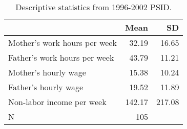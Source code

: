 \begin{table}[ht]
\centering
\begin{tabular}{lrr}
  \hline
 & Mean & SD \\ 
  \hline
Mother's work hours per week & 32.19 & 16.65 \\ 
  Father's work hours per week & 43.79 & 11.21 \\ 
  Mother's hourly wage & 15.38 & 10.24 \\ 
  Father's hourly wage & 19.52 & 11.89 \\ 
  Non-labor income per week & 142.17 & 217.08 \\ 
  N & 105 &  \\ 
   \hline
\end{tabular}
\caption{Descriptive statistics from 1996-2002 PSID.} 
\label{desc2}
\end{table}
